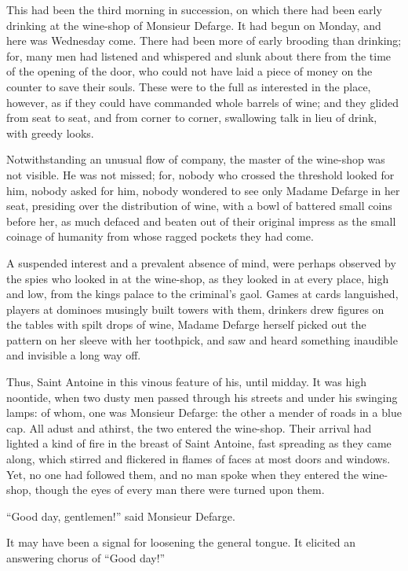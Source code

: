 This had been the third morning in succession, on which there had been
early drinking at the wine-shop of Monsieur Defarge.  It had begun
on Monday, and here was Wednesday come.  There had been more of early
brooding than drinking; for, many men had listened and whispered and
slunk about there from the time of the opening of the door, who could
not have laid a piece of money on the counter to save their souls.
These were to the full as interested in the place, however, as if
they could have commanded whole barrels of wine; and they glided from
seat to seat, and from corner to corner, swallowing talk in lieu
of drink, with greedy looks.

Notwithstanding an unusual flow of company, the master of the wine-shop
was not visible.  He was not missed; for, nobody who crossed the
threshold looked for him, nobody asked for him, nobody wondered to
see only Madame Defarge in her seat, presiding over the distribution
of wine, with a bowl of battered small coins before her, as much defaced
and beaten out of their original impress as the small coinage of humanity
from whose ragged pockets they had come.

A suspended interest and a prevalent absence of mind, were perhaps
observed by the spies who looked in at the wine-shop, as they looked in
at every place, high and low, from the kings palace to the criminal's
gaol.  Games at cards languished, players at dominoes musingly built
towers with them, drinkers drew figures on the tables with spilt drops
of wine, Madame Defarge herself picked out the pattern on her sleeve
with her toothpick, and saw and heard something inaudible and invisible
a long way off.

Thus, Saint Antoine in this vinous feature of his, until midday.  It
was high noontide, when two dusty men passed through his streets and
under his swinging lamps:  of whom, one was Monsieur Defarge:  the other
a mender of roads in a blue cap.  All adust and athirst, the two entered
the wine-shop.  Their arrival had lighted a kind of fire in the breast
of Saint Antoine, fast spreading as they came along, which stirred and
flickered in flames of faces at most doors and windows.  Yet, no one
had followed them, and no man spoke when they entered the wine-shop,
though the eyes of every man there were turned upon them.

``Good day, gentlemen!'' said Monsieur Defarge.

It may have been a signal for loosening the general tongue.
It elicited an answering chorus of ``Good day!''

